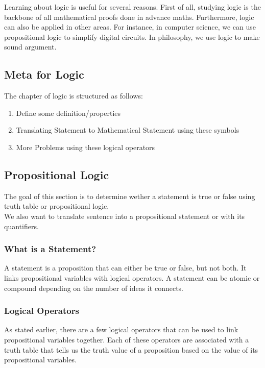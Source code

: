\documentclass{article}
\begin{document}
Learning about logic is useful for several reasons. First of all, studying logic
is the backbone of all mathematical proofs done in advance maths. Furthermore,
logic can also be applied in other areas. For instance, in computer science, we
can use propositional logic to simplify digital circuits. In philosophy, we use
logic to make sound argument.

\subsection{Meta for Logic}

The chapter of logic is structured as follows:

    \begin{enumerate}
	\item Define some definition/properties
	\item Translating Statement to Mathematical Statement using these symbols
	\item More Problems using these logical operators
    \end{enumerate}

\subsection{Propositional Logic}

The goal of this section is to determine wether a statement is true or false
using truth table or propositional logic.\\

We also want to translate sentence into a propositional statement or with its
quantifiers.

\subsubsection{What is a Statement?}

A statement is a proposition that can either be true or false, but not both.
It links propositional variables with logical operators. A statement can be
atomic or compound depending on the number of ideas it connects.

\subsubsection{Logical Operators}

As stated earlier, there are a few logical operators that can be used to link
propositional variables together. Each of these operators are associated with
a truth table that tells us the truth value of a proposition based on the value
of its propositional variables.\\
\end{document}

